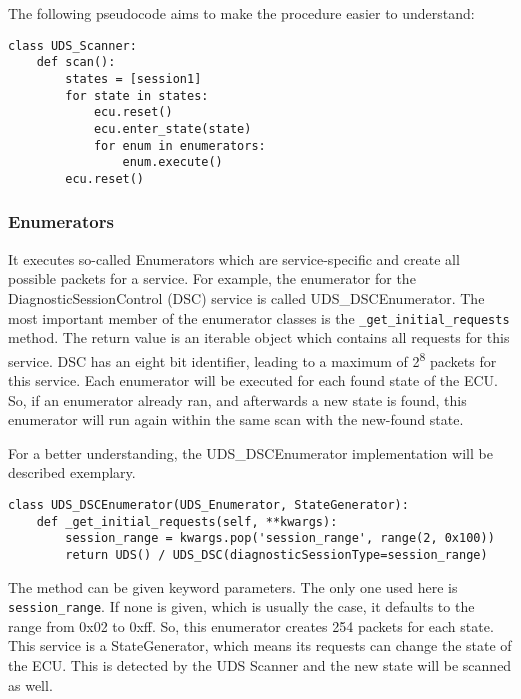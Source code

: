 The following pseudocode aims to make the procedure easier to understand:

\begin{samepage}
\begin{verbatim}
class UDS_Scanner:
    def scan():
        states = [session1]
        for state in states:
            ecu.reset()
            ecu.enter_state(state)
            for enum in enumerators:
                enum.execute()
        ecu.reset()
\end{verbatim}
\end{samepage}

\subsubsection{Enumerators}


It executes so-called Enumerators which are service-specific and create all possible packets for a service.
For example, the enumerator for the DiagnosticSessionControl (DSC) service is called UDS\_DSCEnumerator. The most important member of the enumerator classes is the \texttt{_get_initial_requests} method. The return value is an iterable object which contains all requests for this service. DSC has an eight bit identifier, leading to a maximum of 2\textsuperscript{8} packets for this service. Each enumerator will be executed for each found state of the ECU. So, if an enumerator already ran, and afterwards a new state is found, this enumerator will run again within the same scan with the new-found state.

For a better understanding, the UDS\_DSCEnumerator implementation will be described exemplary.

\begin{samepage}
\begin{verbatim}
class UDS_DSCEnumerator(UDS_Enumerator, StateGenerator):
    def _get_initial_requests(self, **kwargs):
        session_range = kwargs.pop('session_range', range(2, 0x100))
        return UDS() / UDS_DSC(diagnosticSessionType=session_range)
\end{verbatim}
\end{samepage}

The method can be given keyword parameters. The only one used here is \texttt{session_range}. If none is given, which is usually the case, it defaults to the range from 0x02 to 0xff. So, this enumerator creates 254 packets for each state. This service is a StateGenerator, which means its requests can change the state of the ECU. This is detected by the UDS Scanner and the new state will be scanned as well.


